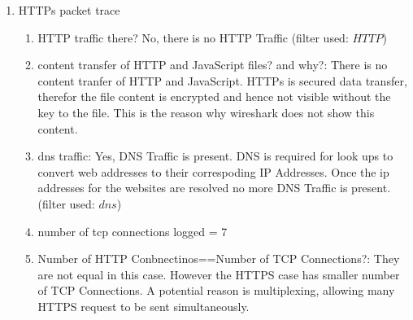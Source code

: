 \documentclass[12pt]{article}
\begin{document}
\begin{enumerate}
\begin{enumerate}
\begin{figure}[h!]
        \end{figure}
    \end{enumerate}
    \item HTTPs packet trace
    \begin{enumerate}
        \item HTTP traffic there? No, there is no HTTP Traffic (filter used: $HTTP$)
        \item content transfer of HTTP and JavaScript files? and why?: There is no content tranfer of HTTP and JavaScript. HTTPs is secured data transfer, therefor the file content is encrypted and hence not visible without the key to the file. This is the reason why wireshark does not show this content.
        \item dns traffic: Yes, DNS Traffic is present. DNS is required for look ups to convert web addresses to their correspoding IP Addresses. Once the ip addresses for the websites are resolved no more DNS Traffic is present. (filter used: $dns$)
        \item number of tcp connections logged = 7
        \item Number of HTTP Conbnectinos==Number of TCP Connections?: They are not equal in this case. However the HTTPS case has smaller number of TCP Connections. A potential reason is multiplexing, allowing many HTTPS request to be sent simultaneously.
    \end{enumerate}
\end{enumerate}
\end{document}

